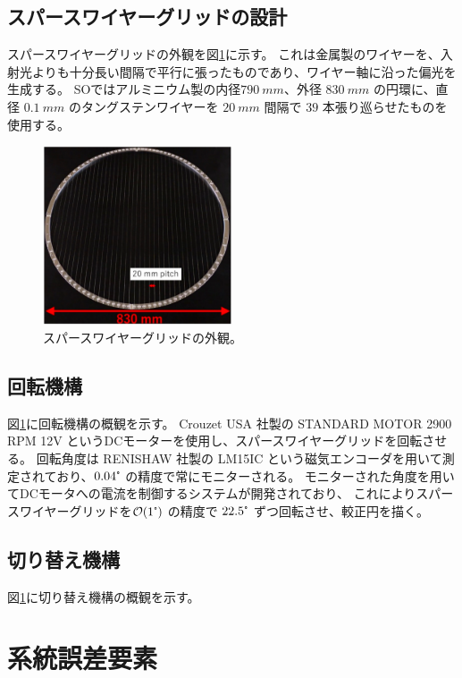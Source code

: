 \documentclass[../../main.tex]{subfiles}
\begin{document}
\subsection{スパースワイヤーグリッドの設計}
スパースワイヤーグリッドの外観を図\ref{fig:wiregrid_appearance}に示す。
これは金属製のワイヤーを、入射光よりも十分長い間隔で平行に張ったものであり、ワイヤー軸に沿った偏光を生成する。
SOではアルミニウム製の内径$\SI{790}{mm}$、外径 $\SI{830}{mm}$ の円環に、直径 $\SI{0.1}{mm}$ のタングステンワイヤーを $\SI{20}{mm}$ 間隔で $39$ 本張り巡らせたものを使用する。
\begin{figure}[H]
    \centering
    \includegraphics[width=0.5\textwidth]{wiregrid/wiregrid_appearance.pdf}
    \caption[スパースワイヤーグリッドの外観]{スパースワイヤーグリッドの外観\cite{}。}
    \label{fig:wiregrid_appearance}    
\end{figure}
\subsection{回転機構}
図\ref{}に回転機構の概観を示す。
Crouzet USA 社製の STANDARD MOTOR 2900 RPM 12V というDCモーターを使用し、スパースワイヤーグリッドを回転させる。
回転角度は RENISHAW 社製の LM15IC という磁気エンコーダを用いて測定されており、$0.04\tcdegree$ の精度で常にモニターされる。
モニターされた角度を用いてDCモータへの電流を制御するシステムが開発されており、
これによりスパースワイヤーグリッドを$\order{1\tcdegree}$ の精度で $22.5\tcdegree$ ずつ回転させ、較正円を描く\cite{swg:nakata}。

\subsection{切り替え機構}
図\ref{}に切り替え機構の概観を示す。



\section{系統誤差要素}
\end{document}
